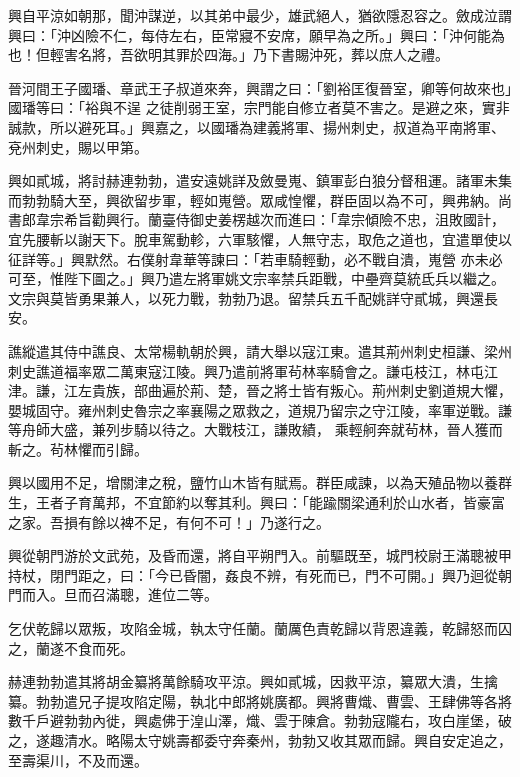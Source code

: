 \begin{pinyinscope}
 興自平涼如朝那，聞沖謀逆，以其弟中最少，雄武絕人，猶欲隱忍容之。斂成泣謂興曰：「沖凶險不仁，每侍左右，臣常寢不安席，願早為之所。」興曰：「沖何能為也！但輕害名將，吾欲明其罪於四海。」乃下書賜沖死，葬以庶人之禮。



 晉河間王子國璠、章武王子叔道來奔，興謂之曰：「劉裕匡復晉室，卿等何故來也」國璠等曰：「裕與不逞
 之徒削弱王室，宗門能自修立者莫不害之。是避之來，實非誠款，所以避死耳。」興嘉之，以國璠為建義將軍、揚州刺史，叔道為平南將軍、兗州刺史，賜以甲第。



 興如貳城，將討赫連勃勃，遣安遠姚詳及斂曼嵬、鎮軍彭白狼分督租運。諸軍未集而勃勃騎大至，興欲留步軍，輕如嵬營。眾咸惶懼，群臣固以為不可，興弗納。尚書郎韋宗希旨勸興行。蘭臺侍御史姜楞越次而進曰：「韋宗傾險不忠，沮敗國計，宜先腰斬以謝天下。脫車駕動軫，六軍駭懼，人無守志，取危之道也，宜遣單使以征詳等。」興默然。右僕射韋華等諫曰：「若車騎輕動，必不戰自潰，嵬營
 亦未必可至，惟陛下圖之。」興乃遣左將軍姚文宗率禁兵距戰，中壘齊莫統氐兵以繼之。文宗與莫皆勇果兼人，以死力戰，勃勃乃退。留禁兵五千配姚詳守貳城，興還長安。



 譙縱遣其侍中譙良、太常楊軌朝於興，請大舉以寇江東。遣其荊州刺史桓謙、梁州刺史譙道福率眾二萬東寇江陵。興乃遣前將軍茍林率騎會之。謙屯枝江，林屯江津。謙，江左貴族，部曲遍於荊、楚，晉之將士皆有叛心。荊州刺史劉道規大懼，嬰城固守。雍州刺史魯宗之率襄陽之眾救之，道規乃留宗之守江陵，率軍逆戰。謙等舟師大盛，兼列步騎以待之。大戰枝江，謙敗績，
 乘輕舸奔就茍林，晉人獲而斬之。茍林懼而引歸。



 興以國用不足，增關津之稅，鹽竹山木皆有賦焉。群臣咸諫，以為天殖品物以養群生，王者子育萬邦，不宜節約以奪其利。興曰：「能踰關梁通利於山水者，皆豪富之家。吾損有餘以裨不足，有何不可！」乃遂行之。



 興從朝門游於文武苑，及昏而還，將自平朔門入。前驅既至，城門校尉王滿聰被甲持杖，閉門距之，曰：「今已昏闇，姦良不辨，有死而已，門不可開。」興乃迴從朝門而入。旦而召滿聰，進位二等。



 乞伏乾歸以眾叛，攻陷金城，執太守任蘭。蘭厲色責乾歸以背恩違義，乾歸怒而囚之，蘭遂不食而死。



 赫連勃勃遣其將胡金纂將萬餘騎攻平涼。興如貳城，因救平涼，纂眾大潰，生擒纂。勃勃遣兄子提攻陷定陽，執北中郎將姚廣都。興將曹熾、曹雲、王肆佛等各將數千戶避勃勃內徙，興處佛于湟山澤，熾、雲于陳倉。勃勃寇隴右，攻白崖堡，破之，遂趣清水。略陽太守姚壽都委守奔秦州，勃勃又收其眾而歸。興自安定追之，至壽渠川，不及而還。




\end{pinyinscope}
